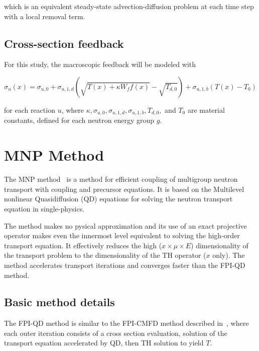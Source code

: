 \documentclass{proposal}
\begin{document}
which is an equivalent steady-state advection-diffusion problem at each time step with a local removal term.

\subsection{Cross-section feedback}

For this study, the macroscopic feedback will be modeled with

\begin{equation}\label{eq:temp-xs}
    \sigma_u(x) = \sigma_{u, 0} + \sigma_{u, 1, d}\left( \sqrt{T(x) + \kappa W_f f(x)} - \sqrt{T_{d, 0}} \right)  + \sigma_{u, 1, b}\left(T(x) -T_0 \right)
\end{equation}

for each reaction $u$, where  $\kappa, \sigma_{u, 0}, \sigma_{u, 1, d}, \sigma_{u, 1, b}, T_{d, 0},$ and $T_0$ are material constants, defined for each neutron energy group $g$.






\section{MNP Method}

The MNP method~\cite{tamang2014multilevel} is a method for efficient coupling of multigroup neutron transport with coupling and precursor equations. It is based on the Multilevel nonlinear Quasidiffusion (QD) equations for solving the neutron transport equation in single-physics.

The method makes no pysical approximation and its use of an exact projective operator makes even the innermost level equivalent to solving the high-order transport equation. It effectively reduces the high ($x\times\mu\times E$) dimensionality of the transport problem to the dimensionality of the TH operator ($x$ only). The method accelerates transport iterations and converges faster than the FPI-QD method.

\subsection{Basic method details}

The FPI-QD method is similar to the FPI-CMFD method described in~\cite{adamowicz2021nilo,adamowicz2023nilo}, where each outer iteration consists of a cross section evaluation, solution of the transport equation accelerated by QD, then TH solution to yield $T$.
\end{document}
